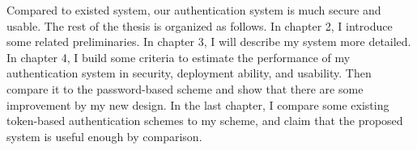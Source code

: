 \begin{CJK}{Bg5}{bsmi}
Compared to existed system, our authentication system is much secure and usable. The rest of the thesis is organized as follows. In chapter 2, I introduce some related preliminaries. In chapter 3, I will describe my system more detailed. In chapter 4, I build some criteria to estimate the performance of my authentication system in security, deployment ability, and usability. Then compare it to the password-based scheme and show that there are some improvement by my new design. In the last chapter, I compare some existing token-based authentication schemes to my scheme, and claim that the proposed system is useful enough by comparison.

\end{CJK}
